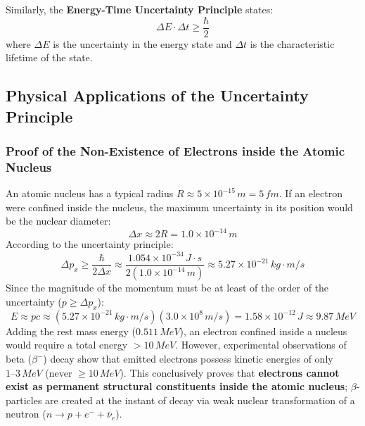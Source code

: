 Similarly, the \textbf{Energy-Time Uncertainty Principle} states:
\begin{equation}
    \Delta E \cdot \Delta t \ge \frac{\hbar}{2}
\end{equation}
where $\Delta E$ is the uncertainty in the energy state and $\Delta t$ is the characteristic lifetime of the state.

\subsection{Physical Applications of the Uncertainty Principle}

\subsubsection{Proof of the Non-Existence of Electrons inside the Atomic Nucleus}
An atomic nucleus has a typical radius $R \approx 5 \times 10^{-15}\,\si{m} = 5\,\si{fm}$. If an electron were confined inside the nucleus, the maximum uncertainty in its position would be the nuclear diameter:
\begin{equation}
    \Delta x \approx 2R = 1.0 \times 10^{-14}\,\si{m}
\end{equation}
According to the uncertainty principle:
\begin{equation}
    \Delta p_x \ge \frac{\hbar}{2\Delta x} \approx \frac{1.054 \times 10^{-34}\,\si{J\cdot s}}{2(1.0 \times 10^{-14}\,\si{m})} \approx 5.27 \times 10^{-21}\,\si{kg\cdot m/s}
\end{equation}
Since the magnitude of the momentum must be at least of the order of the uncertainty ($p \ge \Delta p_x$):
\begin{equation}
    E \approx p c \approx (5.27 \times 10^{-21}\,\si{kg\cdot m/s})(3.0 \times 10^8\,\si{m/s}) = 1.58 \times 10^{-12}\,\si{J} \approx 9.87\,\si{MeV}
\end{equation}
Adding the rest mass energy ($0.511\,\si{MeV}$), an electron confined inside a nucleus would require a total energy $> 10\,\si{MeV}$. However, experimental observations of beta ($\beta^-$) decay show that emitted electrons possess kinetic energies of only $1\text{--}3\,\si{MeV}$ (never $\ge 10\,\si{MeV}$). This conclusively proves that \textbf{electrons cannot exist as permanent structural constituents inside the atomic nucleus}; $\beta$-particles are created at the instant of decay via weak nuclear transformation of a neutron ($n \to p + e^- + \bar{\nu}_e$).

